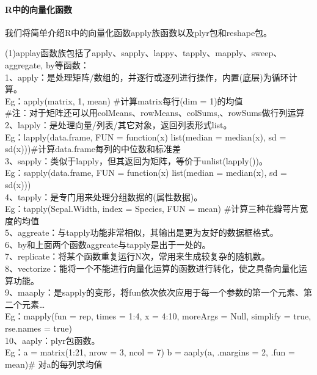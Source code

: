             \paragraph{R中的向量化函数}我们将简单介绍R中的向量化函数apply族函数以及plyr包和reshape包。
            \par
            (1)applay函数族包括了apply、sapply、lappy、tapply、mapply、sweep、aggregate, by等函数：\\
            1、apply：是处理矩阵/数组的，并逐行或逐列进行操作，内置(底层)为循环计算。\\
            Eg：apply(matrix, 1, mean) \#计算matrix每行(dim = 1)的均值\\
            \#注：对于矩阵还可以用colMeans、rowMeans、colSums,、rowSums做行列运算\\
            2、lapply：是处理向量/列表/其它对象，返回列表形式list。\\
            Eg：lapply(data.frame, FUN = function(x) list(median = median(x), sd = sd(x)))\#计算data.frame每列的中位数和标准差\\
            3、sapply：类似于lapply，但其返回为矩阵，等价于unlist(lapply())。\\
            Eg：sapply(data.frame, FUN = function(x) list(median = median(x), sd = sd(x))) \\
            4、tapply：是专门用来处理分组数据的(属性数据)。\\
            Eg：tapply(Sepal.Width, index = Species, FUN = mean) \#计算三种花瓣萼片宽度的均值\\
            5、aggreate：与tapply功能非常相似，其输出是更为友好的数据框格式。\\
            6、by和上面两个函数aggreate与tapply是出于一处的。\\
            7、replicate：将某个函数重复运行N次，常用来生成较复杂的随机数。\\
            8、vectorize：能将一个不能进行向量化运算的函数进行转化，使之具备向量化运算功能。\\
            9、maaply：是sapply的变形，将fun依次依次应用于每一个参数的第一个元素、第二个元素…\\
            Eg：mapply(fun = rep, times = 1:4, x = 4:10, moreArgs = Null, simplify = true,  rse.names = true)\\
            10、aaply：plyr包函数。\\
            Eg：a = matrix(1:21, nrow = 3, ncol = 7) b = aaply(a, .margins = 2, .fun = mean)\# 对a的每列求均值
            \par
